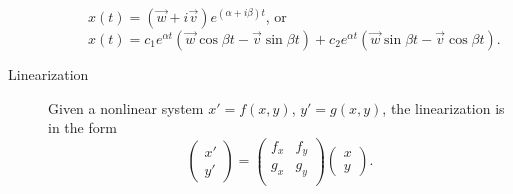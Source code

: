 \documentclass[8pt]{article}
\begin{document}
\begin{multicols}{2}
\begin{description}
\begin{description}
      $x(t)=(\vec{w}+i\vec{v})e^{(\alpha+i\beta)t}$, or $x(t)=c_1e^{\alpha
        t}(\vec{w}\cos\beta t-\vec{v}\sin\beta t) + c_2e^{\alpha
        t}(\vec{w}\sin\beta t-\vec{v}\cos\beta t)$.
    \end{description}
  \item[Linearization] Given a nonlinear system $x'=f(x,y)$, $y'=g(x,y)$, the
    linearization is in the form
    \begin{equation*}
      \begin{pmatrix} x' \\ y' \end{pmatrix} =
      \begin{pmatrix} f_x & f_y \\ g_x & g_y \\ \end{pmatrix}
      \begin{pmatrix} x \\ y \end{pmatrix}.
    \end{equation*}
   \end{description}
 \end{multicols}
\end{document}
